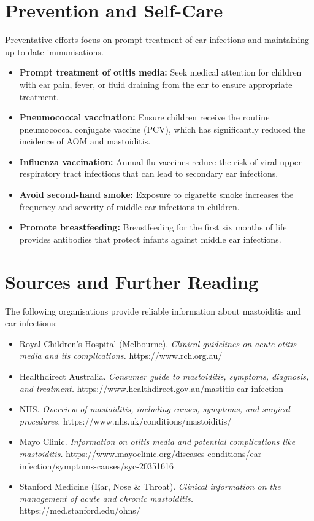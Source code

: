 \section*{Prevention and Self-Care}
Preventative efforts focus on prompt treatment of ear infections and maintaining up-to-date immunisations.
\begin{itemize}
    \item \textbf{Prompt treatment of otitis media:} Seek medical attention for children with ear pain, fever, or fluid draining from the ear to ensure appropriate treatment.
    \item \textbf{Pneumococcal vaccination:} Ensure children receive the routine pneumococcal conjugate vaccine (PCV), which has significantly reduced the incidence of AOM and mastoiditis.
    \item \textbf{Influenza vaccination:} Annual flu vaccines reduce the risk of viral upper respiratory tract infections that can lead to secondary ear infections.
    \item \textbf{Avoid second-hand smoke:} Exposure to cigarette smoke increases the frequency and severity of middle ear infections in children.
    \item \textbf{Promote breastfeeding:} Breastfeeding for the first six months of life provides antibodies that protect infants against middle ear infections.
\end{itemize}

\section*{Sources and Further Reading}
The following organisations provide reliable information about mastoiditis and ear infections:
\begin{itemize}
    \item Royal Children's Hospital (Melbourne). \textit{Clinical guidelines on acute otitis media and its complications.} https://www.rch.org.au/
    \item Healthdirect Australia. \textit{Consumer guide to mastoiditis, symptoms, diagnosis, and treatment.} https://www.healthdirect.gov.au/mastitis-ear-infection
    \item NHS. \textit{Overview of mastoiditis, including causes, symptoms, and surgical procedures.} https://www.nhs.uk/conditions/mastoiditis/
    \item Mayo Clinic. \textit{Information on otitis media and potential complications like mastoiditis.} https://www.mayoclinic.org/diseases-conditions/ear-infection/symptoms-causes/syc-20351616
    \item Stanford Medicine (Ear, Nose \& Throat). \textit{Clinical information on the management of acute and chronic mastoiditis.} https://med.stanford.edu/ohns/
\end{itemize}
